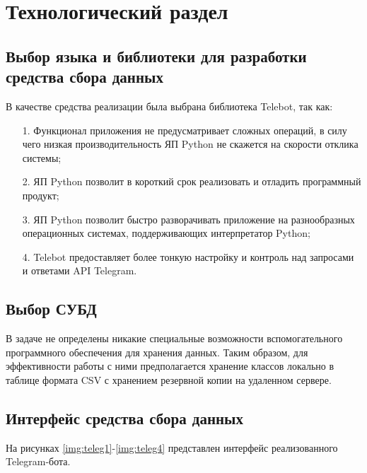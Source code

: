 \section{Технологический раздел}

\subsection{Выбор языка и библиотеки для разработки средства сбора данных}

В качестве средства реализации была выбрана библиотека Telebot, так как:

\begin{enumerate}
	\item[1.] Функционал приложения не предусматривает сложных операций, в силу чего низкая производительность ЯП Python не скажется на скорости отклика системы;
	\item[2.] ЯП Python позволит в короткий срок реализовать и отладить программный продукт;
	\item[3.] ЯП Python позволит быстро разворачивать приложение на разнообразных операционных системах, поддерживающих интерпретатор Python;
	\item[4.] Telebot предоставляет более тонкую настройку и контроль над запросами и ответами API Telegram.
\end{enumerate}

\subsection{Выбор СУБД}

В задаче не определены никакие специальные возможности вспомогательного программного обеспечения для хранения данных. Таким образом, для эффективности работы с ними предполагается хранение классов локально в таблице формата CSV \cite{csv} с хранением резервной копии на удаленном сервере.

\subsection{Интерфейс средства сбора данных}

На рисунках \ref{img:teleg1}-\ref{img:teleg4} представлен интерфейс реализованного Telegram-бота.

